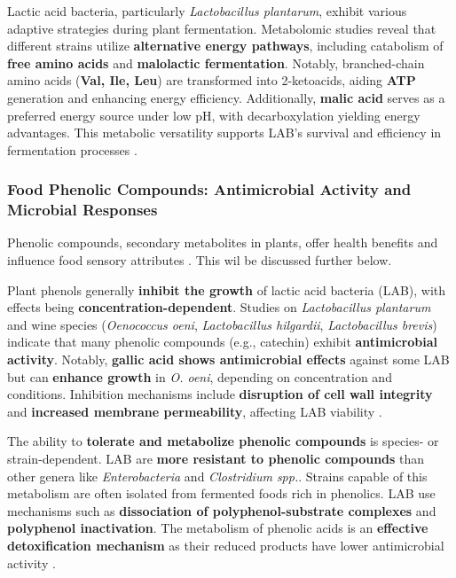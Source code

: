 Lactic acid bacteria, particularly \textit{Lactobacillus plantarum}, exhibit various adaptive strategies during plant fermentation. Metabolomic studies reveal that different strains utilize \textbf{alternative energy pathways}, including catabolism of \textbf{free amino acids} and \textbf{malolactic fermentation}. Notably, branched-chain amino acids (\textbf{Val, Ile, Leu}) are transformed into 2-ketoacids, aiding \textbf{ATP} generation and enhancing energy efficiency. Additionally, \textbf{malic acid} serves as a preferred energy source under low pH, with decarboxylation yielding energy advantages. This metabolic versatility supports LAB's survival and efficiency in fermentation processes \cite*{L8-VegFruit}.

\subsubsection{Food Phenolic Compounds: Antimicrobial Activity and Microbial Responses}
Phenolic compounds, secondary metabolites in plants, offer health benefits and influence food sensory attributes \cite*{L8-VegFruit}. This wil be discussed further below.

Plant phenols generally \textbf{inhibit the growth} of lactic acid bacteria (LAB), with effects being \textbf{concentration-dependent}. Studies on \textit{Lactobacillus plantarum} and wine species (\textit{Oenococcus oeni}, \textit{Lactobacillus hilgardii}, \textit{Lactobacillus brevis}) indicate that many phenolic compounds (e.g., catechin) exhibit \textbf{antimicrobial activity}. Notably, \textbf{gallic acid shows antimicrobial effects} against some LAB but can \textbf{enhance growth} in \textit{O. oeni}, depending on concentration and conditions. Inhibition mechanisms include \textbf{disruption of cell wall integrity} and \textbf{increased membrane permeability}, affecting LAB viability \cite*{L8-VegFruit}.

The ability to \textbf{tolerate and metabolize phenolic compounds} is species- or strain-dependent. LAB are \textbf{more resistant to phenolic compounds} than other genera like \textit{Enterobacteria} and \textit{Clostridium spp.}. Strains capable of this metabolism are often isolated from fermented foods rich in phenolics. LAB use mechanisms such as \textbf{dissociation of polyphenol-substrate complexes} and \textbf{polyphenol inactivation}. The metabolism of phenolic acids is an \textbf{effective detoxification mechanism} as their reduced products have lower antimicrobial activity \cite*{L8-VegFruit}.

